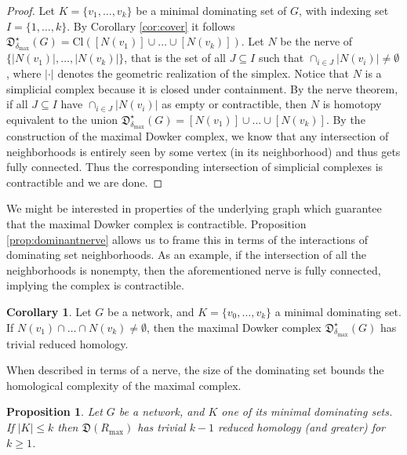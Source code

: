 \documentclass[pdflatex,bst/sn-mathphys-num]{sn-jnl}%
\theoremstyle{thmstyleone}%
\newtheorem{prop}[theorem]{Proposition}%
\theoremstyle{definition}
\newtheorem{cor}[theorem]{Corollary}
\theoremstyle{thmstyletwo}%
\newcommand{\FD}{\mathfrak{D}}
\theoremstyle{thmstylethree}%
\begin{document}
\begin{proof}
    Let $K=\{v_1,\dotsc, v_k\}$ be a minimal dominating set of $G$, with indexing set $I=\{1,\dotsc, k\}$. By Corollary \ref{cor:cover} it follows $\FD^\star_{\delta_\text{max}}(G) = \text{Cl}\left([N(v_1)] \cup \dotsc \cup [N(v_k)]\right)$. Let $N$ be the nerve of $\{|N(v_1)|, \dotsc , |N(v_k)|\}$, that is the set of all $J\subseteq I$ such that $\cap_{i\in J}|N(v_i)| \neq \emptyset$, where $|\cdot|$ denotes the geometric realization of the simplex. Notice that $N$ is a simplicial complex because it is closed under containment. By the nerve theorem, if all $J\subseteq I$ have $\cap_{i\in J}|N(v_i)|$ as empty or contractible, then $N$ is homotopy equivalent to the union $\FD^\star_{\delta_\text{max}}(G) = [N(v_1)] \cup \dotsc \cup [N(v_k)]$. By the construction of the maximal Dowker complex, we know that any intersection of neighborhoods is entirely seen by some vertex (in its neighborhood) and thus gets fully connected. Thus the corresponding intersection of simplicial complexes is contractible and we are done.  
\end{proof}

We might be interested in properties of the underlying graph which guarantee that the maximal Dowker complex is contractible. Proposition \ref{prop:dominantnerve} allows us to frame this in terms of the interactions of dominating set neighborhoods. As an example, if the intersection of all the neighborhoods is nonempty, then the aforementioned nerve is fully connected, implying the complex is contractible.


\begin{cor}
    Let $G$ be a network, and $K=\{v_0,\dotsc,v_k\}$ a minimal dominating set. If $N(v_1) \cap \dotsc \cap N(v_k)\not=\emptyset$, then the maximal Dowker complex $\FD^\star_{\delta_\text{max}}(G)$ has trivial reduced homology.
\end{cor}


When described in terms of a nerve, the size of the dominating set bounds the homological complexity of the maximal complex. 


\begin{prop}\label{prop:Dominating_set_reduction}
    Let $G$ be a network, and $K$ one of its minimal dominating sets. If $|K|\leq k$ then $\FD(R_\text{max})$ has trivial $k-1$ reduced homology (and greater) for $k \geq 1$.
\end{prop}
\end{document}
